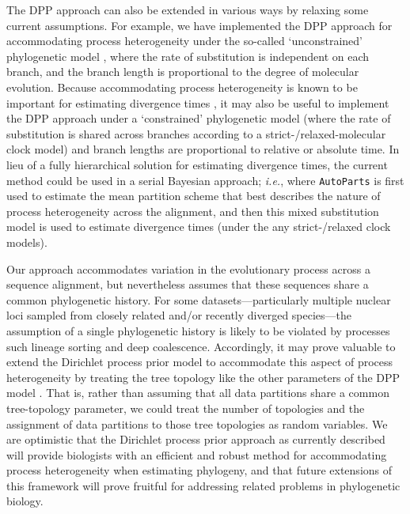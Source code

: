 \documentclass[11pt]{article}
\begin{document}
The DPP approach can also be extended in various ways by relaxing some current assumptions.
For example, we have implemented the DPP approach for accommodating process heterogeneity under the so-called `unconstrained' phylogenetic model \citep[{\it e.g.},][]{Heath14}, where the rate of substitution is independent on each branch, and the branch length is proportional to the degree of molecular evolution.
Because accommodating process heterogeneity is known to be important for estimating divergence times \citep[{\it e.g.},][]{marshall06,poux08,vendetti08}, it may also be useful to implement the DPP approach under a `constrained' phylogenetic model (where the rate of substitution is shared across branches according to a strict-/relaxed-molecular clock model) and branch lengths are proportional to relative or absolute time. 
In lieu of a fully hierarchical solution for estimating divergence times, the current method could be used in a serial Bayesian approach; {\it i.e.}, where \verb!AutoParts! is first used to estimate the mean partition scheme that best describes the nature of process heterogeneity across the alignment, and then this mixed substitution model is used to estimate divergence times (under the any strict-/relaxed clock models). 

Our approach accommodates variation in the evolutionary process across a sequence alignment, but nevertheless assumes that these sequences share a common phylogenetic history. 
For some datasets---particularly multiple nuclear loci sampled from closely related and/or recently diverged species---the assumption of a single phylogenetic history is likely to be violated by processes such lineage sorting and deep coalescence.  
Accordingly, it may prove valuable to extend the Dirichlet process prior model to accommodate this aspect of process heterogeneity by treating the tree topology like the other parameters of the DPP model \citep[{\it c.f.}, ][]{ane07}.  
That is, rather than assuming that all data partitions share a common tree-topology parameter, we could treat the number of topologies and the assignment of data partitions to those tree topologies as random variables.  
We are optimistic that the Dirichlet process prior approach as currently described will provide biologists with an efficient and robust method for accommodating process heterogeneity when estimating phylogeny, and that future extensions of this framework will prove fruitful for addressing related problems in phylogenetic biology.

\bigskip
\end{document}
